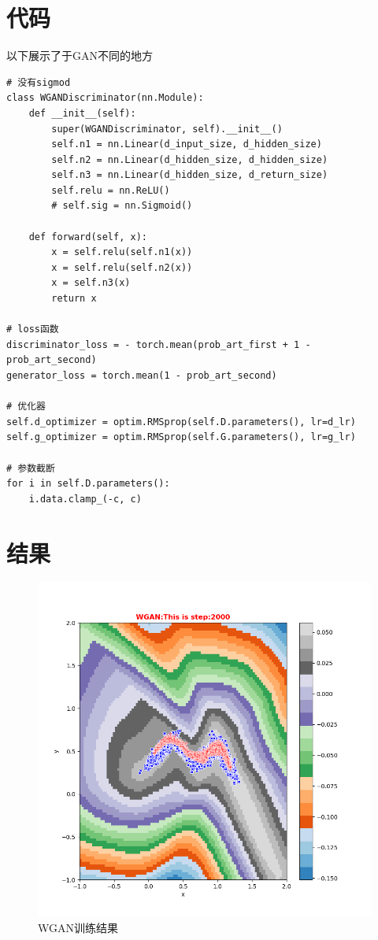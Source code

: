 \documentclass[12pt, a4paper]{report}
\begin{document}
\section{代码}

以下展示了于GAN不同的地方
\small
\begin{verbatim}
# 没有sigmod
class WGANDiscriminator(nn.Module):
    def __init__(self):
        super(WGANDiscriminator, self).__init__()
        self.n1 = nn.Linear(d_input_size, d_hidden_size)
        self.n2 = nn.Linear(d_hidden_size, d_hidden_size)
        self.n3 = nn.Linear(d_hidden_size, d_return_size)
        self.relu = nn.ReLU()
        # self.sig = nn.Sigmoid()

    def forward(self, x):
        x = self.relu(self.n1(x))
        x = self.relu(self.n2(x))
        x = self.n3(x)
        return x

# loss函数
discriminator_loss = - torch.mean(prob_art_first + 1 - prob_art_second)
generator_loss = torch.mean(1 - prob_art_second)

# 优化器
self.d_optimizer = optim.RMSprop(self.D.parameters(), lr=d_lr)
self.g_optimizer = optim.RMSprop(self.G.parameters(), lr=g_lr)

# 参数截断
for i in self.D.parameters():
    i.data.clamp_(-c, c)

\end{verbatim}

\normalsize

\section{结果}

\begin{figure}[ht]
  \centering
  \includegraphics[scale=0.6]{figure2.png}
  \caption{WGAN训练结果}
  \label{}
\end{figure}
\end{document}
